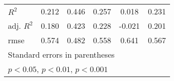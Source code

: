 {\begin{tabular}{l*{5}{c}}
\(R^{2}\)   &       0.212         &       0.446         &       0.257         &       0.018         &       0.231         \\
adj. \(R^{2}\)&       0.180         &       0.423         &       0.228         &      -0.021         &       0.201         \\
rmse        &       0.574         &       0.482         &       0.558         &       0.641         &       0.567         \\
\hline\hline
\multicolumn{6}{l}{\footnotesize Standard errors in parentheses}\\
\multicolumn{6}{l}{\footnotesize \sym{*} \(p<0.05\), \sym{**} \(p<0.01\), \sym{***} \(p<0.001\)}\\
\end{tabular}
}
